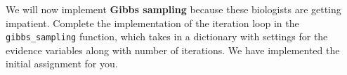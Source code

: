 \item {}

We will now implement \textbf{Gibbs sampling} because these biologists are getting impatient. Complete the implementation of the iteration loop in the \texttt{gibbs\_sampling} function, which takes in a dictionary with settings for the evidence variables along with number of iterations. We have implemented the initial assignment for you.

